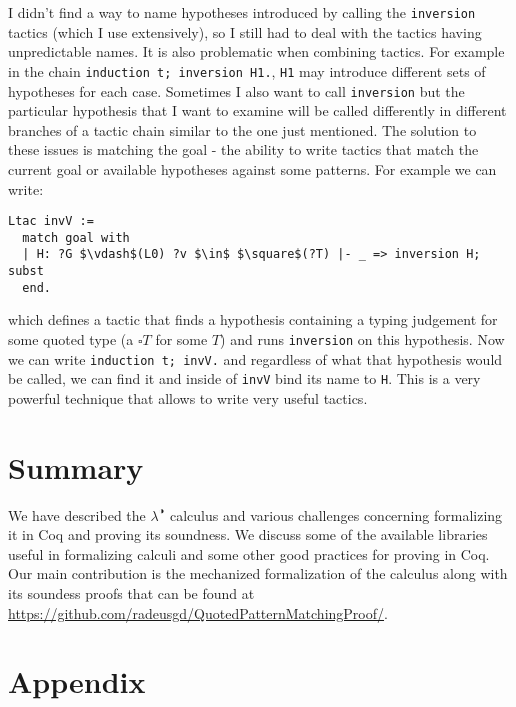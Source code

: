 \documentclass[runningheads]{article}
\begin{document}
I didn't find a way to name hypotheses introduced by calling the \verb|inversion| tactics (which I use extensively), so I still had to deal with the tactics having unpredictable names. It is also problematic when combining tactics. For example in the chain \verb|induction t; inversion H1.|, \verb|H1| may introduce different sets of hypotheses for each case. Sometimes I also want to call \verb|inversion| but the particular hypothesis that I want to examine will be called differently in different branches of a tactic chain similar to the one just mentioned. The solution to these issues is matching the goal - the ability to write tactics that match the current goal or available hypotheses against some patterns. For example we can write:
\begin{lstlisting}[mathescape=true]
Ltac invV :=
  match goal with
  | H: ?G $\vdash$(L0) ?v $\in$ $\square$(?T) |- _ => inversion H; subst
  end.
\end{lstlisting}
which defines a tactic that finds a hypothesis containing a typing judgement for some quoted type (a $\square T$ for some $T$) and runs \verb|inversion| on this hypothesis. Now we can write \verb|induction t; invV.| and regardless of what that hypothesis would be called, we can find it and inside of \verb|invV| bind its name to \verb|H|. This is a very powerful technique that allows to write very useful tactics.


\section{Summary}

We have described the $\lambda^{\RIGHTcircle}$ calculus and various challenges concerning formalizing it in Coq and proving its soundness. We discuss some of the available libraries useful in formalizing calculi and some other good practices for proving in Coq. Our main contribution is the mechanized formalization of the calculus along with its soundess proofs that can be found at \href{https://github.com/radeusgd/QuotedPatternMatchingProof/}{https://github.com/radeusgd/QuotedPatternMatchingProof/}.





\section*{Appendix}

\newcommand{\quoted}[1]{\Box\;#1}
\newcommand{\lift}[1]{\texttt{lift}\;#1}
\newcommand{\qtype}[1]{\Box#1}
\newcommand{\splice}[1]{\$\;#1}
\newcommand{\fix}[1]{\texttt{fix}\;#1}
\newcommand{\app}[2]{#1\;#2}
\newcommand{\tpd}[2]{{#1}{:}{#2}}
\end{document}
